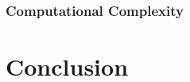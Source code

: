 \documentclass{article}
\begin{document}
\subsubsection{Computational Complexity}




\section{Conclusion}





\end{document}
